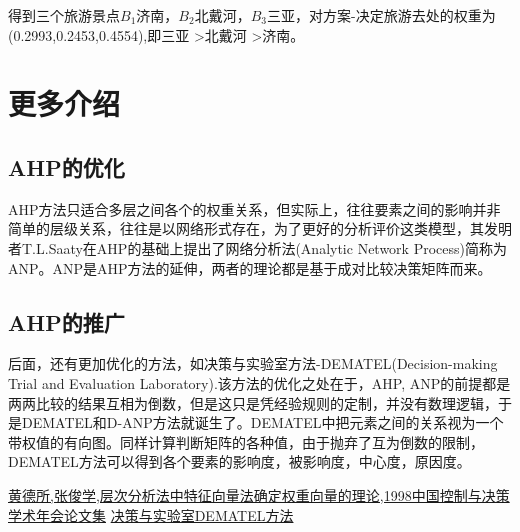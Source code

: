 \documentclass{ctexart}
\begin{document}
    
得到三个旅游景点$B_{1}$济南，$B_{2}$北戴河，$B_{3}$三亚，对方案-决定旅游去处的权重为\\(0.2993,0.2453,0.4554),即三亚 \textgreater 北戴河 \textgreater 济南。
    
\section{更多介绍}
\subsection{AHP的优化}
AHP方法只适合多层之间各个的权重关系，但实际上，往往要素之间的影响并非简单的层级关系，往往是以网络形式存在，为了更好的分析评价这类模型，其发明者T.L.Saaty在AHP的基础上提出了网络分析法(Analytic Network Process)简称为ANP。ANP是AHP方法的延伸，两者的理论都是基于成对比较决策矩阵而来。

\subsection{AHP的推广}
后面，还有更加优化的方法，如决策与实验室方法-DEMATEL(Decision-making Trial and Evaluation Laboratory)\cite{ref2}.该方法的优化之处在于，AHP, ANP的前提都是两两比较的结果互相为倒数，但是这只是凭经验规则的定制，并没有数理逻辑，于是DEMATEL和D-ANP方法就诞生了。DEMATEL中把元素之间的关系视为一个带权值的有向图。同样计算判断矩阵的各种值，由于抛弃了互为倒数的限制，DEMATEL方法可以得到各个要素的影响度，被影响度，中心度，原因度。

\begin{thebibliography}{99}  

\href{https://max.book118.com/html/2019/0103/8106046045001143.shtm}{黄德所,张俊学,层次分析法中特征向量法确定权重向量的理论,1998中国控制与决策学术年会论文集}
\href{http://www.huaxuejia.cn/ism/dematelintro.php}{决策与实验室DEMATEL方法}
\end{thebibliography}
\end{document}

